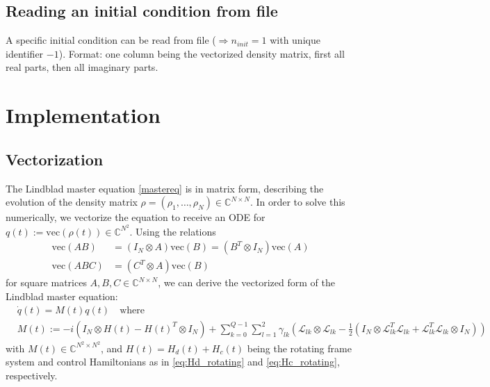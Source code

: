 \documentclass[11pt]{article}
\newcommand{\Ell}{\mathcal{L}}
\newcommand{\C}{\mathds{C}}
\begin{document}
\subsection{Reading an initial condition from file}
A specific initial condition can be read from file ($\Rightarrow n_{init}=1$ with unique identifier $-1$). Format: one column being the vectorized density matrix, first all real parts, then all imaginary parts. 



\section{Implementation}

  \subsection{Vectorization}
  The Lindblad master equation \eqref{mastereq} is in matrix form, describing
  the evolution of the density matrix $\rho = (\rho_1, \dots, \rho_N) \in
  \C^{N\times N}$. In order to solve this numerically, we vectorize the equation
  to receive an ODE for $q(t) := \text{vec}(\rho(t)) \in \C^{N^2}$. Using the
  relations
  \begin{align}
   \text{vec}(AB) &= (I_N\otimes A)\text{vec}(B) = (B^T\otimes I_N)\text{vec}(A)
    \\
   \text{vec}(ABC) &= (C^T\otimes A)\text{vec}(B)
  \end{align}
  for square matrices $A,B,C\in\C^{N\times N}$, we can derive the vectorized
  form of the Lindblad master equation:
  \begin{align}\label{mastereq_vectorized}
    &\dot q(t) = M(t) q(t) \quad  \text{where} \\
    &M(t) := -i(I_N\otimes H(t) - H(t)^T \otimes I_N) + \sum_{k=0}^{Q-1}\sum_{l=1}^2 \gamma_{lk}
    \left( \Ell_{lk}\otimes \Ell_{lk} - \frac 1 2 \left( I_N\otimes
    \Ell^T_{lk}\Ell_{lk} + \Ell^T_{lk}\Ell_{lk} \otimes I_N \right) \right)
  \end{align}
   with $M(t) \in \C^{N^2\times N^2}$, and $H(t) = H_d(t) + H_c(t)$ being the rotating frame system and control Hamiltonians as in \eqref{eq:Hd_rotating} and \eqref{eq:Hc_rotating}, respectively.
\end{document}
